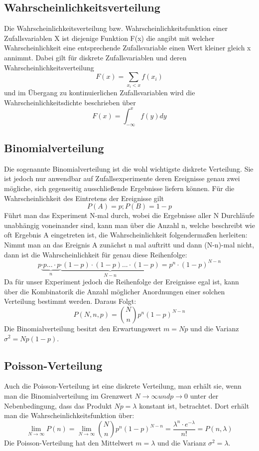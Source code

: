 \documentclass{article}
\begin{document}
            \subsection{Wahrscheinlichkeitsverteilung}
                Die Wahrscheinlichkeitsverteilung bzw. Wahrscheinlichkeitsfunktion einer Zufallsvariablen X ist diejenige Funktion F(x)
                die angibt mit welcher Wahrscheinlichkeit eine entsprechende Zufallsvariable einen Wert kleiner 
                gleich x annimmt. Dabei gilt für diskrete Zufallsvariablen und deren Wahrscheinlichkeitsverteilung
                $$ F(x) = \sum_{x_i < x}f(x_i)$$
                und im Übergang zu kontinuierlichen Zufallsvariablen wird die Wahrscheinlichkeitsdichte beschrieben
                über 
                $$ F(x) = \int_{-\infty}^xf(y)dy$$
            \subsection{Binomialverteilung}
                Die sogenannte Binomialverteilung ist die wohl wichtigste diskrete Verteilung. Sie ist jedoch nur
                anwendbar auf Zufallsexperimente deren Ereignisse genau zwei mögliche, sich gegenseitig ausschließende
                Ergebnisse liefern können. Für die Wahrscheinlichkeit des Eintretens der Ereignisse gilt
                $$P(A) = p ; P(B) = 1 - p $$
                Führt man das Experiment N-mal durch, wobei die Ergebnisse aller N Durchläufe unabhängig voneinander sind,
                kann man über die Anzahl n, welche beschreibt wie oft Ergebnis A eingetreten ist, die Wahrscheinlichkeit 
                folgendermaßen herleiten:
                Nimmt man an das Ereignis A zunächst n mal auftritt und dann (N-n)-mal nicht, dann ist die Wahrscheinlichkeit
                für genau diese Reihenfolge:
                $$ p \underbrace{\cdot p ... \cdot p}_n \underbrace{\cdot (1-p) \cdot (1-p) ... \cdot (1-p)}_{N-n} = p^n \cdot (1-p)^{N-n} $$
                Da für unser Experiment jedoch die Reihenfolge der Ereignisse egal ist, kann über die Kombinatorik die Anzahl
                möglicher Anordnungen einer solchen Verteilung bestimmt werden. Daraus Folgt:
                $$ P(N,n,p) = {N\choose n}p^n(1-p)^{N-n} $$
                Die Binomialverteilung besitzt den Erwartungswert $m=Np$ und die Varianz $\sigma^2=Np(1-p)$.
            \subsection{Poisson-Verteilung}
                Auch die Poisson-Verteilung ist eine diskrete Verteilung, man erhält sie, wenn man die Binomialverteilung
                im Grenzwert $N \rightarrow \infty und p \rightarrow 0$ unter der Nebenbedingung, dass das Produkt $Np =
                \lambda$ konstant ist, betrachtet. Dort erhält man die Wahrscheinlichkeitsfunktion über:
                $$ \lim_{N\rightarrow\infty} P(n) = \lim_{N\rightarrow\infty}{N\choose n}p^n(1-p)^{N-n}=\frac{\lambda^n\cdot e^{-\lambda}}{n!} = P(n,\lambda)$$
                Die Poisson-Verteilung hat den Mittelwert $m = \lambda$  und die Varianz $\sigma^2 = \lambda$.
\end{document}
